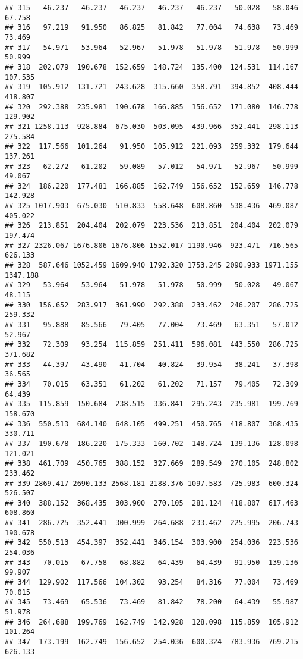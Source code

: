 \documentclass[
]{article}
\begin{document}
\begin{verbatim}
## 315   46.237   46.237   46.237   46.237   46.237   50.028   58.046   67.758
## 316   97.219   91.950   86.825   81.842   77.004   74.638   73.469   73.469
## 317   54.971   53.964   52.967   51.978   51.978   51.978   50.999   50.999
## 318  202.079  190.678  152.659  148.724  135.400  124.531  114.167  107.535
## 319  105.912  131.721  243.628  315.660  358.791  394.852  408.444  418.807
## 320  292.388  235.981  190.678  166.885  156.652  171.080  146.778  129.902
## 321 1258.113  928.884  675.030  503.095  439.966  352.441  298.113  275.584
## 322  117.566  101.264   91.950  105.912  221.093  259.332  179.644  137.261
## 323   62.272   61.202   59.089   57.012   54.971   52.967   50.999   49.067
## 324  186.220  177.481  166.885  162.749  156.652  152.659  146.778  142.928
## 325 1017.903  675.030  510.833  558.648  608.860  538.436  469.087  405.022
## 326  213.851  204.404  202.079  223.536  213.851  204.404  202.079  197.474
## 327 2326.067 1676.806 1676.806 1552.017 1190.946  923.471  716.565  626.133
## 328  587.646 1052.459 1609.940 1792.320 1753.245 2090.933 1971.155 1347.188
## 329   53.964   53.964   51.978   51.978   50.999   50.028   49.067   48.115
## 330  156.652  283.917  361.990  292.388  233.462  246.207  286.725  259.332
## 331   95.888   85.566   79.405   77.004   73.469   63.351   57.012   52.967
## 332   72.309   93.254  115.859  251.411  596.081  443.550  286.725  371.682
## 333   44.397   43.490   41.704   40.824   39.954   38.241   37.398   36.565
## 334   70.015   63.351   61.202   61.202   71.157   79.405   72.309   64.439
## 335  115.859  150.684  238.515  336.841  295.243  235.981  199.769  158.670
## 336  550.513  684.140  648.105  499.251  450.765  418.807  368.435  330.711
## 337  190.678  186.220  175.333  160.702  148.724  139.136  128.098  121.021
## 338  461.709  450.765  388.152  327.669  289.549  270.105  248.802  233.462
## 339 2869.417 2690.133 2568.181 2188.376 1097.583  725.983  600.324  526.507
## 340  388.152  368.435  303.900  270.105  281.124  418.807  617.463  608.860
## 341  286.725  352.441  300.999  264.688  233.462  225.995  206.743  190.678
## 342  550.513  454.397  352.441  346.154  303.900  254.036  223.536  254.036
## 343   70.015   67.758   68.882   64.439   64.439   91.950  139.136   99.907
## 344  129.902  117.566  104.302   93.254   84.316   77.004   73.469   70.015
## 345   73.469   65.536   73.469   81.842   78.200   64.439   55.987   51.978
## 346  264.688  199.769  162.749  142.928  128.098  115.859  105.912  101.264
## 347  173.199  162.749  156.652  254.036  600.324  783.936  769.215  626.133

\end{verbatim}
\end{document}
